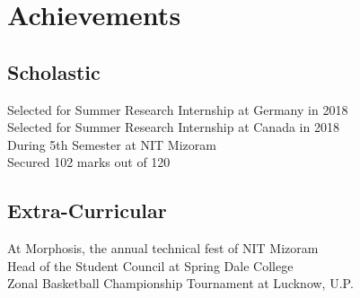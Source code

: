 
\section{Achievements} 
\subsection{Scholastic}
Selected for Summer Research Internship at Germany in 2018 \\
Selected for Summer Research Internship at Canada in 2018 \\
During 5th Semester at NIT Mizoram \\
Secured 102 marks out of 120 \\
\sectionsep

\subsection{Extra-Curricular}
At Morphosis, the annual technical fest of NIT Mizoram \\
Head of the Student Council at Spring Dale College \\
Zonal Basketball Championship Tournament at Lucknow, U.P. \\
\sectionsep